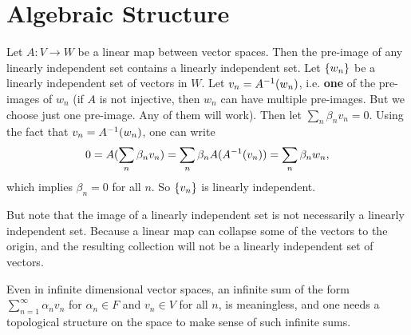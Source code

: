 \chapter{Algebraic Structure}


\begin{summary}
	Let $ A:V\to W $ be a linear map between vector spaces. Then the pre-image of any linearly independent set contains a linearly independent set. Let $ \{w_n\} $ be a linearly independent set of vectors in $ W $. Let $ v_n = A^{-1}(w_n) $, i.e. \textbf{one} of the pre-images of $ w_n $ (if $ A $ is not injective, then $ w_n $ can have multiple pre-images. But we choose just one pre-image. Any of them will work). Then let $ \sum_n \beta_n v_n = 0 $. Using the fact that $ v_n = A^{-1}(w_n) $, one can write
	\[ 0 = A(\sum_n \beta_n v_n) = \sum_n \beta_n A(A^{-1}(v_n)) = \sum_n \beta_n w_n,  \]
	which implies $ \beta_n = 0 $ for all $ n $. So $ \{v_n\} $ is linearly independent.
	
	But note that the image of a linearly independent set is not necessarily a linearly independent set. Because a linear map can collapse some of the vectors to the origin, and the resulting collection will not be a linearly independent set of vectors. 
\end{summary}

\begin{summary}
	Even in infinite dimensional vector spaces, an infinite sum of the form $ \sum_{n=1}^{\infty} \alpha_n v_n $ for $ \alpha_n \in F $ and $ v_n\in V $ for all $ n $, is  meaningless, and one needs a topological structure on the space to make sense of such infinite sums.
\end{summary}


